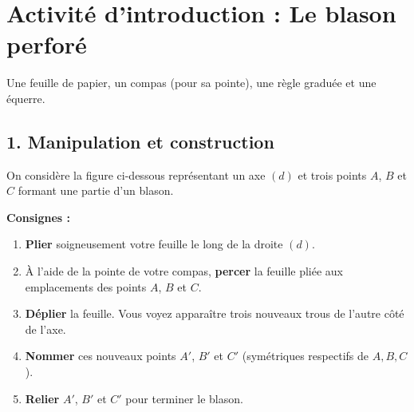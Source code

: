 \documentclass[a4paper]{book}
\begin{document}
\setcounter{chapter}{12}
\renewcommand{\monTitre}{La symétrie axiale}

\enteteActivite{1}{\monTitre}{\thechapter}

\section*{Activité d'introduction : Le blason perforé}
    
    \begin{tcolorbox}[colback=blue!5,colframe=blue!75!black,title=Matériel nécessaire]
        Une feuille de papier, un compas (pour sa pointe), une règle graduée et une équerre.
    \end{tcolorbox}
    
\subsection*{1. Manipulation et construction}
    
    On considère la figure ci-dessous représentant un axe $(d)$ et trois points $A$, $B$ et $C$ formant une partie d'un blason.
    
    \begin{center}
    \end{center}
    
    \textbf{Consignes :}
    \begin{enumerate}
        \item \textbf{Plier} soigneusement votre feuille le long de la droite $(d)$.
        \item À l'aide de la pointe de votre compas, \textbf{percer} la feuille pliée aux emplacements des points $A$, $B$ et $C$.
        \item \textbf{Déplier} la feuille. Vous voyez apparaître trois nouveaux trous de l'autre côté de l'axe.
        \item \textbf{Nommer} ces nouveaux points $A'$, $B'$ et $C'$ (symétriques respectifs de $A, B, C$).
        \item \textbf{Relier} $A'$, $B'$ et $C'$ pour terminer le blason.
    \end{enumerate}
    
\end{document}
